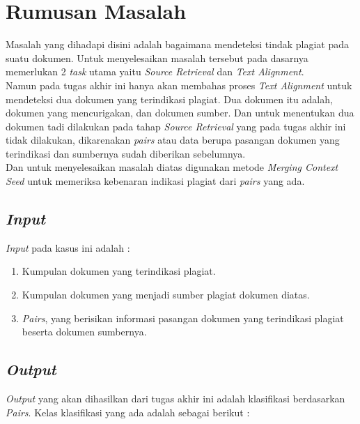 \documentclass[../Proposal.tex]{subfiles}
\begin{document}
	\section{Rumusan Masalah}
	\noindent Masalah yang dihadapi disini adalah bagaimana mendeteksi tindak plagiat pada suatu dokumen. Untuk menyelesaikan masalah tersebut pada dasarnya memerlukan 2 \textit{task} utama yaitu \textit{Source Retrieval} dan \textit{Text Alignment}. \\
	
	\noindent Namun pada tugas akhir ini hanya akan membahas proses \textit{Text Alignment} untuk mendeteksi dua dokumen yang terindikasi plagiat. Dua dokumen itu adalah, dokumen yang mencurigakan, dan dokumen sumber. Dan untuk menentukan dua dokumen tadi dilakukan pada tahap \textit{Source Retrieval} yang pada tugas akhir ini tidak dilakukan, dikarenakan \textit{pairs} atau data berupa pasangan dokumen yang terindikasi dan sumbernya sudah diberikan sebelumnya. \\
	
	\noindent Dan untuk menyelesaikan masalah diatas digunakan metode \textit{Merging Context Seed} untuk memeriksa kebenaran indikasi plagiat dari \textit{pairs} yang ada.
	
	\subsection{\textit{Input}}
	\textit{Input} pada kasus ini adalah :
	\begin{enumerate}
		\item Kumpulan dokumen yang terindikasi plagiat.
		\item Kumpulan dokumen yang menjadi sumber plagiat dokumen diatas.
		\item \textit{Pairs}, yang berisikan informasi pasangan dokumen yang terindikasi plagiat beserta dokumen sumbernya.	
	\end{enumerate}
	
	\subsection{\textit{Output}}
	\textit{Output} yang akan dihasilkan dari tugas akhir ini adalah klasifikasi berdasarkan \textit{Pairs}. Kelas klasifikasi yang ada adalah sebagai berikut :
	
\end{document}
